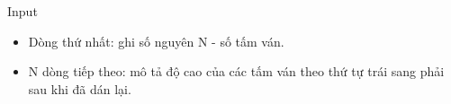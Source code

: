 Input
\begin{itemize}
	\item     Dòng thứ nhất: ghi số nguyên N - số tấm ván.   
	\item     N dòng tiếp theo: mô tả độ cao của các tấm ván theo thứ tự trái sang phải sau khi đã dán lại.   
\end{itemize}